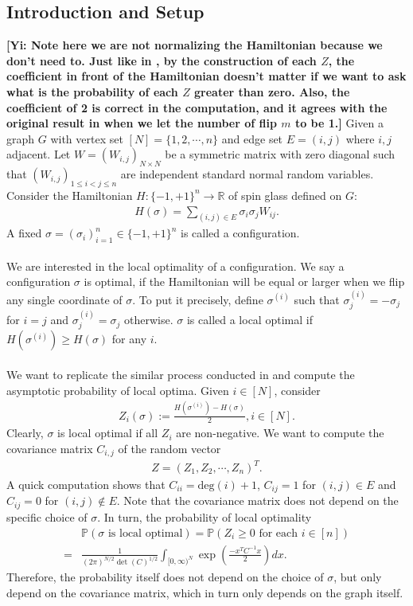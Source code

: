 \documentclass[10pt]{article}
\newcommand{\p}{\mathbb{P}}
\newcommand{\gy}[1]{\textbf{\color{red}[Yi: #1]}}
\newenvironment{Proof of lemma}{\noindent{\bf Proof of Lemma}}{\hfill$\Box$\newline}
\newenvironment{Proof of claim}{\noindent{\bf Proof of claim}}{\hfill$\Box$\newline}
\newenvironment{Proof of theorem}{\noindent{\bf Proof of Theorem}}{\hfill\scriptsize{$\Box$}\newline}
\newenvironment{Proof of theorems}{\noindent{\bf Proof of Theorems}}{\hfill$\Box$\newline}
\newenvironment{Proof of proposition}{\noindent{\bf Proof of Proposition}}{\hfill$\Box$\newline}
\newenvironment{Proof of propositions}{\noindent{\bf Proof of Propositions}}{\hfill$\Box$\newline}
\newenvironment{Proof of exercise}{\noindent{\it Proof of Exercise:}}{\hfill$\Box$}
\numberwithin{equation}{section}
\begin{document}
\subsection{Introduction and Setup}
\gy{Note here we are not normalizing the Hamiltonian because we don't need to. Just like in \cite{SK_optimal}, by the construction of each $Z$, the coefficient in front of the Hamiltonian doesn't matter if we want to ask what is the probability of each $Z$ greater than zero. Also, the coefficient of 2 is correct in the computation, and it agrees with the original result in \cite{SK_optimal} when we let the number of flip $m$ to be 1.}
Given a graph $G$ with vertex set $[N]=\{1,2,\cdots,n\}$ and edge set $E = (i,j)$ where $i,j$ adjacent. Let $W = (W_{i,j})_{N\times N}$ be a symmetric matrix with zero diagonal such that $(W_{i,j})_{1 \leq i < j \leq n}$ are independent standard normal random variables. Consider the Hamiltonian $H:\{-1,+1\}^n \to \mathbb{R}$ of spin glass defined on $G$:
\begin{align}
    H(\sigma) = \sum_{(i,j) \in E} \sigma_i \sigma_j W_{ij}.
\end{align}
A fixed $\sigma = (\sigma_i)^n_{i=1} \in \{-1,+1\}^n$ is called a configuration. \\ \\
We are interested in the local optimality of a configuration. We say a configuration  $\sigma$ is optimal, if the Hamiltonian will be equal or larger when we flip any single coordinate of $\sigma$. To put it precisely, define $\sigma^{(i)}$ such that $\sigma^{(i)}_j = -\sigma_j$ for $i= j$ and $\sigma^{(i)}_j = \sigma_j$ otherwise. $\sigma$ is called a local optimal if $H(\sigma^{(i)}) \geq H(\sigma)$ for any $i$. \\ \\
We want to replicate the similar process conducted in \cite{SK_optimal} and compute the asymptotic probability of local optima. Given $i \in [N]$, consider
\begin{align}
    Z_i(\sigma) := \frac{H(\sigma^{(i)})-H(\sigma)}{2}, i\in [N].
\end{align}
Clearly, $\sigma$ is local optimal if all $Z_i$ are non-negative. We want to compute the covariance matrix $C_{i,j}$ of the random vector
\begin{align}
    Z = (Z_1,Z_2,\cdots,Z_n)^{T}.
\end{align}
A quick computation shows that $C_{ii} = \text{deg}(i)+1$, $C_{ij}=1$ for $(i,j) \in E$ and $C_{ij}=0$ for $(i,j) \notin E$. Note that the covariance matrix does not depend on the specific choice of $\sigma$. In turn, the probability of local optimality
\begin{align} \label{lo_prob}
    &\p(\sigma \text{ is local optimal}) = \p(Z_i \geq 0 \text{ for each } i \in [n]) \nonumber \\
    =& \frac{1}{(2\pi)^{N/2}\det(C)^{1/2}}\int_{[0,\infty)^N} \exp\left(\frac{-x^{T}C^{-1}x}{2}\right)dx.
\end{align}
Therefore, the probability itself does not depend on the choice of $\sigma$, but only depend on the covariance matrix, which in turn only depends on the graph itself.
\end{document}
